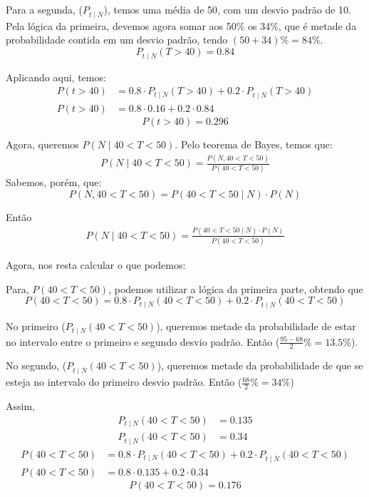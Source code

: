 \documentclass[a5paper]{report}
\begin{document}
Para a segunda, ($P_{t \mid \overline{N}}$), temos uma média de 50, com um desvio padrão de 10. Pela lógica da primeira, devemos agora somar aos 50\% os 34\%, que é metade da probabilidade contida em um desvio padrão, tendo $(50 + 34)\% = 84\%$.
\[P_{t \mid \overline{N}}(T > 40) = 0.84\]

Aplicando aqui, temos:
\begin{align*}
    P(t > 40) &= 0.8 \cdot P_{t \mid N}(T > 40) + 0.2 \cdot P_{t \mid \overline{N}}(T > 40)\\
    P(t > 40) &= 0.8 \cdot 0.16 + 0.2 \cdot 0.84
\end{align*}
\[\boxed{P(t > 40) = 0.296}\]

Agora, queremos $P(N \mid 40 < T < 50)$. Pelo teorema de Bayes, temos que:
\begin{align*}
    P(N \mid 40 < T < 50) = \frac{P(N, 40 < T < 50)}{P(40 < T < 50)}
\end{align*}
Sabemos, porém, que:
\[P(N, 40 < T < 50) = P(40 < T < 50 \mid N) \cdot P(N)\]

Então
\begin{align*}
    P(N \mid 40 < T < 50) = \frac{P(40 < T < 50 \mid N) \cdot P(N)}{P(40 < T < 50)}
\end{align*}

Agora, nos resta calcular o que podemos:

Para, $P(40 < T < 50)$, podemos utilizar a lógica da primeira parte, obtendo que
\[P(40 < T < 50) = 0.8 \cdot P_{t \mid N}(40 < T < 50) + 0.2 \cdot P_{t \mid \overline{N}}(40 < T < 50)\]

No primeiro ($P_{t \mid N}(40 < T < 50)$), queremos metade da probabilidade de estar no intervalo entre o primeiro e segundo desvio padrão. Então ($\frac{95 - 68}{2}\% = 13.5\%$).

No segundo, ($P_{t \mid \overline{N}}(40 < T < 50)$), queremos metade da probabilidade de que se esteja no intervalo do primeiro desvio padrão. Então ($\frac{68}{2}\% = 34\%$)

Assim,
\begin{align*}
    P_{t \mid N}(40 < T < 50) &= 0.135\\
    P_{t \mid \overline{N}}(40 < T < 50) &= 0.34
\end{align*}
\begin{align*}
    P(40 < T < 50) &= 0.8 \cdot P_{t \mid N}(40 < T < 50) + 0.2 \cdot P_{t \mid \overline{N}}(40 < T < 50)\\
    P(40 < T < 50) &= 0.8 \cdot 0.135 + 0.2 \cdot 0.34
\end{align*}
\[\boxed{P(40 < T < 50) = 0.176}\]
\end{document}
